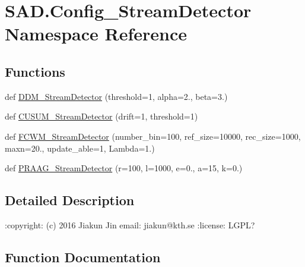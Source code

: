 \hypertarget{namespaceSAD_1_1Config__StreamDetector}{}\section{S\+A\+D.\+Config\+\_\+\+Stream\+Detector Namespace Reference}
\label{namespaceSAD_1_1Config__StreamDetector}
\subsection*{Functions}
\begin{DoxyCompactItemize}
\item 
def \hyperlink{namespaceSAD_1_1Config__StreamDetector_a8fe66fa1ba56758d362751b650b527c9}{D\+D\+M\+\_\+\+Stream\+Detector} (threshold=1, alpha=2., beta=3.)
\item 
def \hyperlink{namespaceSAD_1_1Config__StreamDetector_a9b6e5608d3fa1ec9d349f060c106fe37}{C\+U\+S\+U\+M\+\_\+\+Stream\+Detector} (drift=1, threshold=1)
\item 
def \hyperlink{namespaceSAD_1_1Config__StreamDetector_ac6e6604df8a55cae85d05d26ffb65ae3}{F\+C\+W\+M\+\_\+\+Stream\+Detector} (number\+\_\+bin=100, ref\+\_\+size=10000, rec\+\_\+size=1000, maxn=20., update\+\_\+able=1, Lambda=1.)
\item 
def \hyperlink{namespaceSAD_1_1Config__StreamDetector_a883b97a1c93b25432bae9e26bf93aad9}{P\+R\+A\+A\+G\+\_\+\+Stream\+Detector} (r=100, l=1000, e=0., a=15, k=0.)
\end{DoxyCompactItemize}


\subsection{Detailed Description}
\begin{DoxyVerb}:copyright: (c) 2016 Jiakun Jin
email: jiakun@kth.se
:license: LGPL?
\end{DoxyVerb}
 

\subsection{Function Documentation}

